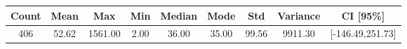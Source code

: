 \begin{tabular}{|c|c|c|c|c|c|c|c|c|}\hline
\rowcolor{Plum!20}
Count&Mean&Max&Min&Median&Mode&Std&Variance&CI [95\%]\\\hline\hline
406&52.62&1561.00&2.00&36.00&35.00&99.56&9911.30&[-146.49,251.73]\\\hline
\end{tabular}
